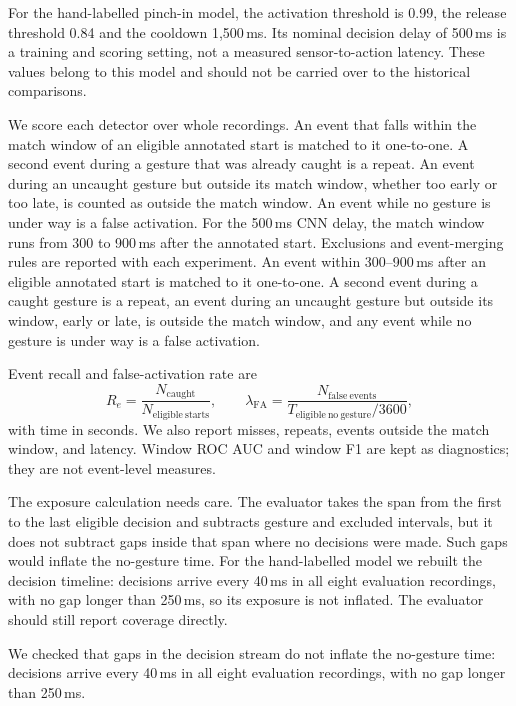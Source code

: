 \iffull
For the hand-labelled pinch-in model, the activation threshold is 0.99, the release threshold 0.84 and the cooldown 1,500\,ms. Its nominal decision delay of 500\,ms is a training and scoring setting, not a measured sensor-to-action latency. These values belong to this model and should not be carried over to the historical comparisons.
\fi

\iffull
{}\label{continuous-metrics-and-eligibility}
\fi

\iffull
We score each detector over whole recordings. An event that falls within the match window of an eligible annotated start is matched to it one-to-one. A second event during a gesture that was already caught is a repeat. An event during an uncaught gesture but outside its match window, whether too early or too late, is counted as outside the match window. An event while no gesture is under way is a false activation. For the 500\,ms CNN delay, the match window runs from 300 to 900\,ms after the annotated start. Exclusions and event-merging rules are reported with each experiment.
\else
An event within 300--900\,ms after an eligible annotated start is matched to it one-to-one. A second event during a caught gesture is a repeat, an event during an uncaught gesture but outside its window, early or late, is outside the match window, and any event while no gesture is under way is a false activation.
\fi

Event recall and false-activation rate are
\[
R_e=\frac{N_{\mathrm{caught}}}{N_{\mathrm{eligible\ starts}}},\qquad
\lambda_{\mathrm{FA}}=\frac{N_{\mathrm{false\ events}}}{T_{\mathrm{eligible\ no\ gesture}}/3600},
\]
with time in seconds. We also report misses, repeats, events outside the match window, and latency. Window ROC AUC and window F1 are kept as diagnostics; they are not event-level measures.

\iffull
The exposure calculation needs care. The evaluator takes the span from the first to the last eligible decision and subtracts gesture and excluded intervals, but it does not subtract gaps inside that span where no decisions were made. Such gaps would inflate the no-gesture time. For the hand-labelled model we rebuilt the decision timeline: decisions arrive every 40\,ms in all eight evaluation recordings, with no gap longer than 250\,ms, so its exposure is not inflated. The evaluator should still report coverage directly.

\else
We checked that gaps in the decision stream do not inflate the no-gesture time: decisions arrive every 40\,ms in all eight evaluation recordings, with no gap longer than 250\,ms.
\fi